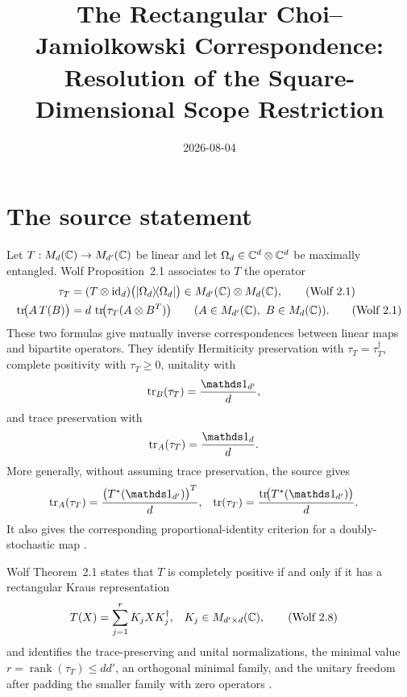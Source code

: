 \documentclass{article}
\title{The Rectangular Choi--Jamiolkowski Correspondence:\\
Resolution of the Square-Dimensional Scope Restriction}
\author{}
\date{2026-08-04}
\begin{document}
\maketitle

\section{The source statement}

Let $T:M_{d}(\mathbb{C})\to M_{d'}(\mathbb{C})$ be linear and let
$\Omega_d\in\mathbb{C}^d\otimes\mathbb{C}^d$ be maximally entangled.  Wolf
Proposition~2.1 associates to $T$ the operator
\begin{align}
    \tau_T
      &= (T\otimes\operatorname{id}_d)
         \bigl(|\Omega_d\rangle\!\langle \Omega_d|\bigr)
       \in M_{d'}(\mathbb{C})\otimes M_{d}(\mathbb{C}),
    \tag{Wolf 2.1}\\
    \operatorname{tr}\!\bigl(A\,T(B)\bigr)
      &= d\,\operatorname{tr}\!\bigl(\tau_T(A\otimes B^{T})\bigr)
    \qquad
    (A\in M_{d'}(\mathbb{C}),\ B\in M_{d}(\mathbb{C})).
    \tag{Wolf 2.1}
\end{align}
These two formulas give mutually inverse correspondences between linear maps
and bipartite operators.  They identify Hermiticity preservation with
$\tau_T=\tau_T^\dagger$, complete positivity with $\tau_T\geq0$, unitality
with
\begin{align}
    \tr_B(\tau_T)&=\frac{\Id_{d'}}{d},
\end{align}
and trace preservation with
\begin{align}
    \tr_A(\tau_T)&=\frac{\Id_d}{d}.
\end{align}
More generally, without assuming trace preservation, the source gives
\begin{align}
    \tr_A(\tau_T)
      &= \frac{\bigl(T^*(\Id_{d'})\bigr)^T}{d},
    &
    \tr(\tau_T)
      &= \frac{\tr\!\bigl(T^*(\Id_{d'})\bigr)}{d}.
\end{align}
It also gives the corresponding proportional-identity criterion for a
doubly-stochastic map \cite[Proposition~2.1]{Wolf2012Quantum}.

Wolf Theorem~2.1 states that $T$ is completely positive if and only if it
has a rectangular Kraus representation
\begin{align}
    T(X)&=\sum_{j=1}^{r}K_jXK_j^\dagger,
    &K_j&\in M_{d'\times d}(\mathbb{C}),
    \tag{Wolf 2.8}
\end{align}
and identifies the trace-preserving and unital normalizations, the minimal
value $r=\operatorname{rank}(\tau_T)\leq dd'$, an orthogonal minimal family,
and the unitary freedom after padding the smaller family with zero
operators \cite[Theorem~2.1]{Wolf2012Quantum}.
\end{document}
